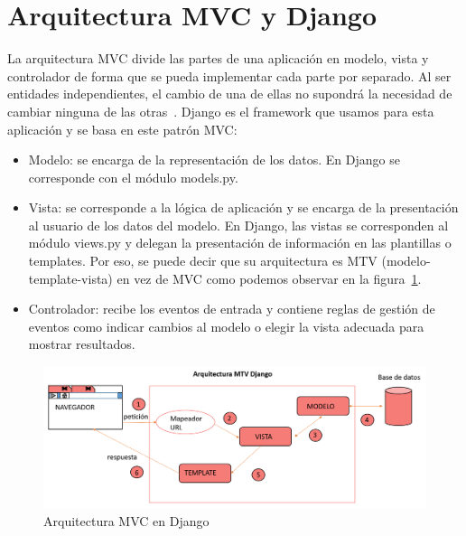 \documentclass[a4paper, 12pt]{book}
\begin{document}
\section{Arquitectura MVC y Django}
La arquitectura MVC divide las partes de una aplicación en modelo, vista y controlador de forma que se pueda implementar cada parte por separado. Al ser entidades independientes, el cambio de una de ellas no supondrá la necesidad de cambiar ninguna de las otras~\cite{gonzalez2012patron}. Django es el framework que usamos para esta aplicación y se basa en este patrón MVC:

\begin{itemize}
    \item Modelo: se encarga de la representación de los datos. En Django se corresponde con el módulo models.py.
    \item Vista: se corresponde a la lógica de aplicación y se encarga de la presentación al usuario de los datos del modelo. En Django, las vistas se corresponden al módulo views.py y delegan la presentación de información en las plantillas o templates. Por eso, se puede decir que su arquitectura es MTV (modelo-template-vista) en vez de MVC como podemos observar en la figura~\ref{figura:MVC}.
    \item Controlador: recibe los eventos de entrada y contiene reglas de gestión de eventos como indicar cambios al modelo o elegir la vista adecuada para mostrar resultados. 
\end{itemize}

\begin{figure}[h]
        \centering
        \includegraphics[scale=0.4]{img/django_request.png}
        \caption{Arquitectura MVC en Django}
        \label{figura:MVC}
\end{figure}
\end{document}
